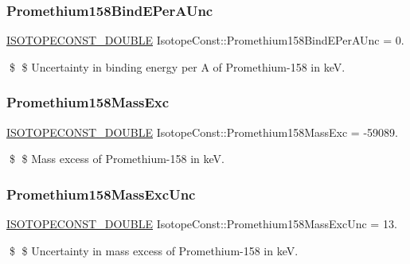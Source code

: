 \subsubsection{\texorpdfstring{Promethium158\+Bind\+E\+Per\+A\+Unc}{Promethium158BindEPerAUnc}}
{\footnotesize\ttfamily \mbox{\hyperlink{group___isotope_const-_macros_ga8f45a7272ce02c0b4c65c44636ed719a}{I\+S\+O\+T\+O\+P\+E\+C\+O\+N\+S\+T\+\_\+\+D\+O\+U\+B\+LE}} Isotope\+Const\+::\+Promethium158\+Bind\+E\+Per\+A\+Unc = 0.}

\$ \$ Uncertainty in binding energy per A of Promethium-\/158 in keV. \mbox{\label{group___isotope_const-_promethium-_pm158_ga1d433ee1ecb8349ed4e1ebda50ad63ef}} 
\subsubsection{\texorpdfstring{Promethium158\+Mass\+Exc}{Promethium158MassExc}}
{\footnotesize\ttfamily \mbox{\hyperlink{group___isotope_const-_macros_ga8f45a7272ce02c0b4c65c44636ed719a}{I\+S\+O\+T\+O\+P\+E\+C\+O\+N\+S\+T\+\_\+\+D\+O\+U\+B\+LE}} Isotope\+Const\+::\+Promethium158\+Mass\+Exc = -\/59089.}

\$ \$ Mass excess of Promethium-\/158 in keV. \mbox{\label{group___isotope_const-_promethium-_pm158_ga8519026b156660c2b707bbb276c6202c}} 
\subsubsection{\texorpdfstring{Promethium158\+Mass\+Exc\+Unc}{Promethium158MassExcUnc}}
{\footnotesize\ttfamily \mbox{\hyperlink{group___isotope_const-_macros_ga8f45a7272ce02c0b4c65c44636ed719a}{I\+S\+O\+T\+O\+P\+E\+C\+O\+N\+S\+T\+\_\+\+D\+O\+U\+B\+LE}} Isotope\+Const\+::\+Promethium158\+Mass\+Exc\+Unc = 13.}

\$ \$ Uncertainty in mass excess of Promethium-\/158 in keV. \mbox{\label{group___isotope_const-_promethium-_pm158_ga931e5feb5cf33cdf4332525a32d4c6a1}} 

